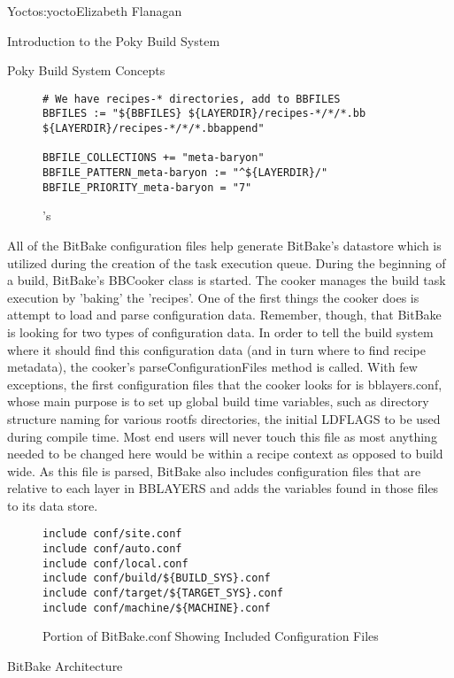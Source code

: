 \begin{aosachapter}{Yocto}{s:yocto}{Elizabeth Flanagan}
\begin{aosasect1}{Introduction to the Poky Build System}
\begin{aosasect2}{Poky Build System Concepts}
\begin{figure}
\begin{verbatim}
# We have recipes-* directories, add to BBFILES
BBFILES := "${BBFILES} ${LAYERDIR}/recipes-*/*/*.bb ${LAYERDIR}/recipes-*/*/*.bbappend"

BBFILE_COLLECTIONS += "meta-baryon"
BBFILE_PATTERN_meta-baryon := "^${LAYERDIR}/"
BBFILE_PRIORITY_meta-baryon = "7"
\end{verbatim}
\caption{'s }
\label{fig.yocto.metabaryon}
\end{figure}

All of the BitBake configuration files help generate BitBake's
datastore which is utilized during the creation of the task execution
queue. During the beginning of a build, BitBake's BBCooker class is
started. The cooker manages the build task execution by 'baking' the
'recipes'. One of the first things the cooker does is attempt to load
and parse configuration data. Remember, though, that BitBake is
looking for two types of configuration data. In order to tell the
build system where it should find this configuration data (and in turn
where to find recipe metadata), the cooker's parseConfigurationFiles
method is called.  With few exceptions, the first configuration files
that the cooker looks for is bblayers.conf, whose main purpose is to
set up global build time variables, such as directory structure naming
for various rootfs directories, the initial LDFLAGS to be used during
compile time. Most end users will never touch this file as most
anything needed to be changed here would be within a recipe context as
opposed to build wide. As this file is parsed, BitBake also includes
configuration files that are relative to each layer in BBLAYERS and
adds the variables found in those files to its data store.

\begin{figure}
\begin{verbatim}
include conf/site.conf
include conf/auto.conf
include conf/local.conf
include conf/build/${BUILD_SYS}.conf
include conf/target/${TARGET_SYS}.conf
include conf/machine/${MACHINE}.conf
\end{verbatim}
\caption{Portion of BitBake.conf Showing Included Configuration Files}
\label{fig.yocto.included}
\end{figure}

\end{aosasect2}

\end{aosasect1}

\begin{aosasect1}{BitBake Architecture}


\end{aosasect1}
\end{aosachapter}
